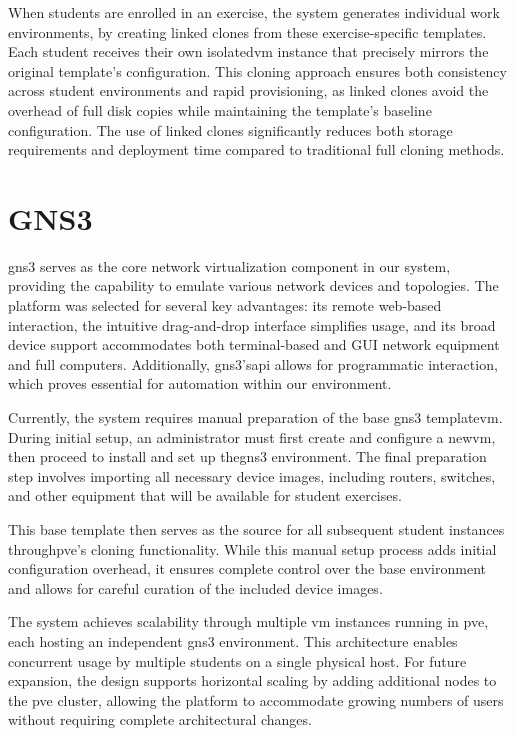             When students are enrolled in an exercise, the system generates individual work environments, by creating linked clones from these 
            exercise-specific templates. Each student receives their own isolated\ac{vm} instance that precisely mirrors the original template's 
            configuration. This cloning approach ensures both consistency across student environments and rapid provisioning, as linked clones 
            avoid the overhead of full disk copies while maintaining the template's baseline configuration. The use of linked clones significantly 
            reduces both storage requirements and deployment time compared to traditional full cloning methods.
        
\section{GNS3}

    \ac{gns3} serves as the core network virtualization component in our system, providing the capability to emulate various network devices 
    and topologies. The platform was selected for several key advantages: its remote web-based interaction, the intuitive drag-and-drop interface 
    simplifies usage, and its broad device support accommodates both terminal-based and GUI network equipment and full computers. Additionally, 
    \ac{gns3}'s\ac{api} allows for programmatic interaction, which proves essential for automation within our environment.

    Currently, the system requires manual preparation of the base \ac{gns3} template\ac{vm}. During initial setup, an administrator must first create 
    and configure a new\ac{vm}, then proceed to install and set up the\ac{gns3} environment. The final preparation step involves importing all 
    necessary device images, including routers, switches, and other equipment that will be available for student exercises.

    This base template then serves as the source for all subsequent student instances through\ac{pve}'s cloning functionality. While this 
    manual setup process adds initial configuration overhead, it ensures complete control over the base environment and allows for careful 
    curation of the included device images.

    The system achieves scalability through multiple \ac{vm} instances running in \ac{pve}, each hosting an independent \ac{gns3} environment. 
    This architecture enables concurrent usage by multiple students on a single physical host. For future expansion, the design supports 
    horizontal scaling by adding additional nodes to the \ac{pve} cluster, allowing the platform to accommodate growing numbers of users 
    without requiring complete architectural changes.

